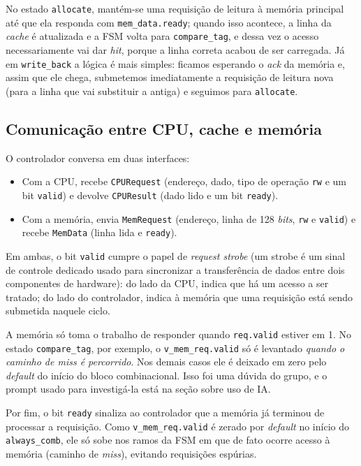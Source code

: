 \documentclass[12pt]{article}
\begin{document}
No estado \texttt{allocate}, mantém-se uma requisição de leitura à memória principal até que ela responda com \texttt{mem\_data.ready}; quando isso acontece, a linha da \emph{cache} é atualizada e a FSM volta para \texttt{compare\_tag}, e dessa vez o acesso necessariamente vai dar \emph{hit}, porque a linha correta acabou de ser carregada. Já em \texttt{write\_back} a lógica é mais simples: ficamos esperando o \emph{ack} da memória e, assim que ele chega, submetemos imediatamente a requisição de leitura nova (para a linha que vai substituir a antiga) e seguimos para \texttt{allocate}.

\subsection{Comunicação entre CPU, cache e memória}

O controlador conversa em duas interfaces:

\begin{itemize}
    \item Com a CPU, recebe \texttt{CPURequest} (endereço, dado,
    tipo de operação \texttt{rw} e um bit \texttt{valid}) e devolve
    \texttt{CPUResult} (dado lido e um bit \texttt{ready}).
    \item Com a memória, envia \texttt{MemRequest} (endereço, linha
    de 128 \emph{bits}, \texttt{rw} e \texttt{valid}) e recebe
    \texttt{MemData} (linha lida e \texttt{ready}).
\end{itemize}

Em ambas, o bit \texttt{valid} cumpre o
papel de \emph{request strobe} (um strobe é um sinal de controle dedicado usado para sincronizar a transferência de dados entre dois componentes de hardware): do lado da CPU, indica que há um
acesso a ser tratado; do lado do controlador, indica à memória que
uma requisição está sendo submetida naquele ciclo. 

A memória só
toma o trabalho de responder quando \texttt{req.valid} estiver em 1. No estado \texttt{compare\_tag}, por exemplo, o
\texttt{v\_mem\_req.valid} só é levantado \emph{quando o caminho
de \emph{miss} é percorrido}. Nos demais casos ele é deixado em
zero pelo \emph{default} do início do bloco combinacional. Isso foi
uma dúvida do grupo, e o prompt usado para investigá-la está na seção sobre uso de IA. 

Por fim, o bit \texttt{ready} 
sinaliza ao controlador que a memória já terminou de processar a
requisição. Como
\texttt{v\_mem\_req.valid} é zerado por \emph{default} no início do
\texttt{always\_comb}, ele só sobe nos ramos da FSM em que de fato
ocorre acesso à memória (caminho de \emph{miss}), evitando
requisições espúrias.
\end{document}
